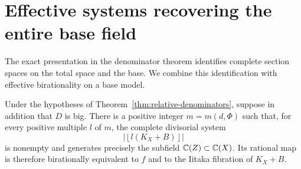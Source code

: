 \section{Effective systems recovering the entire base field}
\label{sec:effective}

The exact presentation in the denominator theorem identifies complete
section spaces on the total space and the base. We combine this
identification with effective birationality on a base model.

\begin{proposition}\label{prop:effective-base}
Under the hypotheses of Theorem~\ref{thm:relative-denominators}, suppose in
addition that $D$ is big.  There is a positive integer $m=m(d,\Phi)$ such
that, for every positive multiple $l$ of $m$, the complete divisorial
system
\[
 \left|\left\lfloor l(K_X+B)\right\rfloor\right|
\]
is nonempty and generates precisely the subfield $\mathbb C(Z)\subset\mathbb C(X)$.
Its rational map is therefore birationally equivalent to $f$ and to the
Iitaka fibration of $K_X+B$.
\end{proposition}

